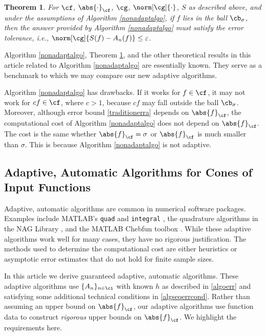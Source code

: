 \documentclass[]{elsarticle}
\newtheorem{theorem}{Theorem}
\theoremstyle{definition}
\theoremstyle{remark}
\newcommand{\Fnorm}[1]{\abs{#1}_{\cf}}
\newcommand{\Gnorm}[1]{\norm[\cg]{#1}}
\begin{document}
\begin{theorem}  \label{NonAdaptDetermThm}  For $\cf$, $\Fnorm{\cdot}$, $\cg$, $\Gnorm{\cdot}$, $S$ as described above, and under the assumptions of Algorithm \ref{nonadaptalgo}, if $f$ lies in the ball $\cb_\sigma$, then the answer provided by Algorithm \ref{nonadaptalgo} must satisfy the error tolerance, i.e., $\norm[\cg]{S(f)-A_n(f)} \le \varepsilon$.
\end{theorem}

Algorithm \ref{nonadaptalgo}, Theorem \ref{NonAdaptDetermThm}, and the other theoretical results in this article related to Algorithm \ref{nonadaptalgo} are essentially known.  They serve as a benchmark to which we may compare our new adaptive algorithms.  

Algorithm \ref{nonadaptalgo} has drawbacks.  If it works for $f \in \cf$, it may not work for $cf \in \cf$, where $c>1$, because $cf$ may fall outside the ball $\cb_\sigma$.  Moreover, although error bound \eqref{traditionerra} depends on $\Fnorm{f}$, the computational cost of Algorithm \ref{nonadaptalgo} does not depend on $\Fnorm{f}$.  The cost is the same whether $\Fnorm{f}=\sigma$ or $\Fnorm{f}$ is much smaller than $\sigma$.  This is because Algorithm \ref{nonadaptalgo} is not adaptive.

\subsection{Adaptive, Automatic Algorithms for Cones of Input Functions} \label{adapintrosec}

Adaptive, automatic algorithms are common in numerical software packages.  Examples include  MATLAB's {\tt quad} and {\tt integral} \cite{MAT8.1}, the quadrature algorithms in the NAG Library \cite{NAG23}, and the MATLAB Chebfun toolbox \cite{TrefEtal12}.  While these adaptive algorithms work well for many cases, they have no rigorous justification. The methods used to determine the computational cost are either heuristics or asymptotic error estimates that do not hold for finite sample sizes.

In this article we derive guaranteed adaptive, automatic algorithms.  These adaptive algorithms use $\{A_n\}_{n \in \ci}$ with known $h$ as described in \eqref{algoerr} and satisfying some additional technical conditions in \eqref{algseqerrcond}.  Rather than assuming an upper bound on $\Fnorm{f}$, our adaptive algorithms use function data to construct \emph{rigorous} upper bounds on $\Fnorm{f}$.  We highlight the requirements here.
\end{document}
